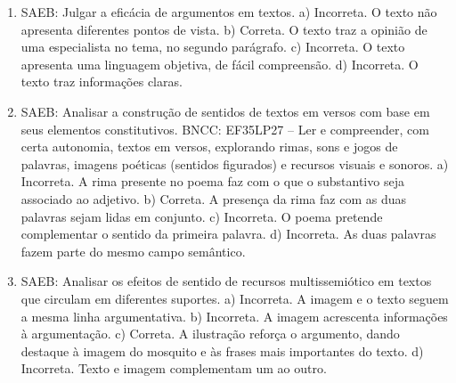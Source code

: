\begin{enumerate}
\item
SAEB: Julgar a eficácia de argumentos em textos. a) Incorreta. O texto não apresenta diferentes pontos de vista. b) Correta. O texto traz a opinião de uma especialista no tema, no segundo parágrafo. c) Incorreta. O texto apresenta uma linguagem objetiva, de fácil compreensão. d) Incorreta. O texto traz informações claras.

\item
SAEB: Analisar a construção de sentidos de textos em versos com base em seus elementos constitutivos. BNCC: EF35LP27 -- Ler e compreender, com certa autonomia, textos em versos, explorando rimas, sons e jogos de palavras, imagens poéticas (sentidos figurados) e recursos visuais e sonoros. a) Incorreta. A rima presente no poema faz com o que o substantivo seja associado ao adjetivo. b) Correta. A presença da rima faz com as duas palavras sejam lidas em conjunto. c) Incorreta. O poema pretende complementar o sentido da primeira palavra. d) Incorreta. As duas palavras fazem parte do mesmo campo semântico.

\item
SAEB: Analisar os efeitos de sentido de recursos multissemiótico em textos que circulam em diferentes suportes. a) Incorreta. A imagem e o texto seguem a mesma linha argumentativa. b) Incorreta. A imagem acrescenta informações à argumentação. c) Correta. A ilustração reforça o argumento, dando destaque à imagem do mosquito e às frases mais importantes do texto. d) Incorreta. Texto e imagem complementam um ao outro.
\end{enumerate}


